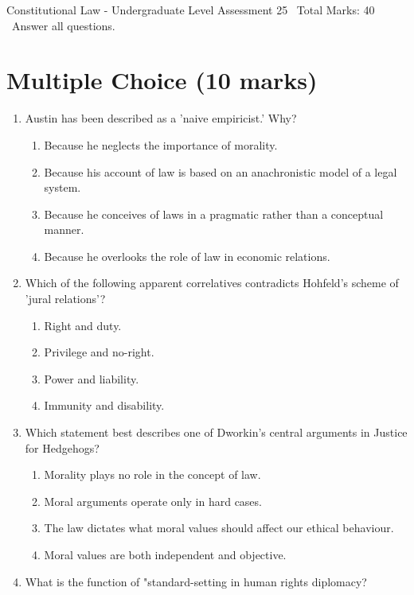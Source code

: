 \documentclass[12pt]{article}
\begin{document}
\begin{center}
Constitutional Law - Undergraduate Level Assessment 25 \
Total Marks: 40 \
Answer all questions.
\end{center}

\section*{Multiple Choice (10 marks)}
\begin{enumerate}[label=\arabic*.]
\item Austin has been described as a 'naive empiricist.' Why?
\begin{enumerate}[label=(\alph*)]
    \item Because he neglects the importance of morality.
    \item Because his account of law is based on an anachronistic model of a legal system.
    \item Because he conceives of laws in a pragmatic rather than a conceptual manner.
    \item Because he overlooks the role of law in economic relations.
\end{enumerate}
\item Which of the following apparent correlatives contradicts Hohfeld's scheme of 'jural relations'?
\begin{enumerate}[label=(\alph*)]
    \item Right and duty.
    \item Privilege and no-right.
    \item Power and liability.
    \item Immunity and disability.
\end{enumerate}
\item Which statement best describes one of Dworkin's central arguments in Justice for Hedgehogs?
\begin{enumerate}[label=(\alph*)]
    \item Morality plays no role in the concept of law.
    \item Moral arguments operate only in hard cases.
    \item The law dictates what moral values should affect our ethical behaviour.
    \item Moral values are both independent and objective.
\end{enumerate}
\item What is the function of "standard-setting in human rights diplomacy?
\begin{enumerate}[label=(\alph*)]

\end{enumerate}
\end{enumerate}
\end{document}
